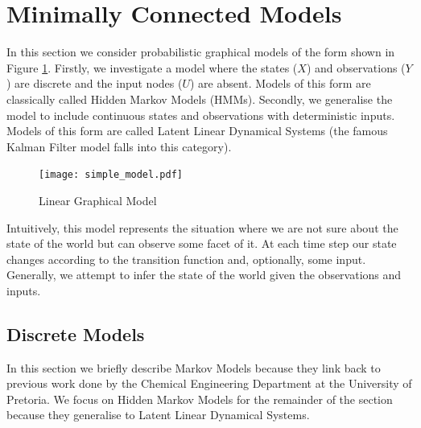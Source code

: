 \documentclass[../masters.tex]{subfiles}
\begin{document}
\graphicspath{{./imgs/}{../imgs/}} %

\section{Minimally Connected Models}
In this section we consider probabilistic graphical models of the form shown in Figure \ref{fig_linmod}. Firstly, we investigate a model where the states ($X$) and observations ($Y$) are discrete and the input nodes ($U$) are absent. Models of this form are classically called Hidden Markov Models (HMMs). Secondly, we generalise the model to include continuous states and observations with deterministic inputs. Models of this form are called Latent Linear Dynamical Systems (the famous Kalman Filter model falls into this category).
\begin{figure}[H] 
\centering
\texttt{[image: simple\_model.pdf]}
\caption{Linear Graphical Model}
\label{fig_linmod}
\end{figure}
Intuitively, this model represents the situation where we are not sure about the state of the world but can observe some facet of it. At each time step our state changes according to the transition function and, optionally, some input. Generally, we attempt to infer the state of the world given the observations and inputs. 

\subsection{Discrete Models}
In this section we briefly describe Markov Models because they link back to previous work done by the Chemical Engineering Department at the University of Pretoria. We focus on Hidden Markov Models for the remainder of the section because they generalise to Latent Linear Dynamical Systems. 
\end{document}
